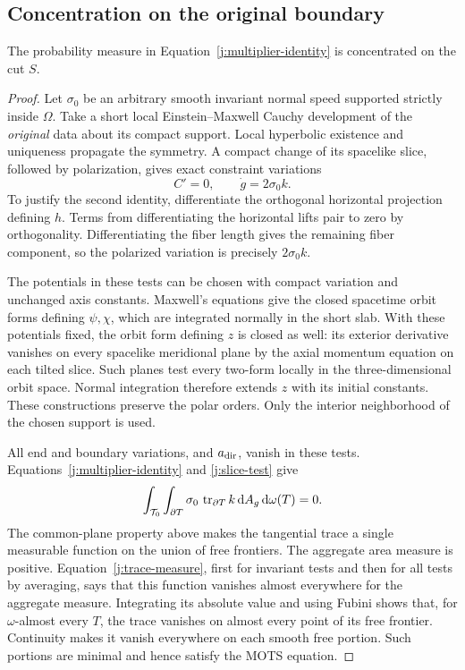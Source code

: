 \subsection{Concentration on the original boundary}

\begin{lemma}
\label{j:concentration}
The probability measure in Equation~\eqref{j:multiplier-identity}
is concentrated on the cut \(S\).
\end{lemma}

\begin{proof}
Let \(\sigma_0\) be an arbitrary smooth invariant normal speed supported
strictly inside \(\Omega\). Take a short local Einstein--Maxwell Cauchy
development of the \emph{original} data about its compact support.
Local hyperbolic existence and uniqueness propagate the symmetry.
A compact change of its spacelike slice, followed by polarization,
gives exact constraint variations
\begin{equation}
\label{j:slice-test}
 C'=0,\qquad \dot g=2\sigma_0k.
\end{equation}
To justify the second identity, differentiate the orthogonal horizontal
projection defining \(h\). Terms from differentiating the horizontal
lifts pair to zero by orthogonality. Differentiating the fiber length
gives the remaining fiber component, so the polarized variation is
precisely \(2\sigma_0k\).

The potentials in these tests can be chosen with compact variation and
unchanged axis constants. Maxwell's equations give the closed spacetime
orbit forms defining \(\psi,\chi\), which are integrated normally in the
short slab. With these potentials fixed, the orbit form defining \(z\)
is closed as well: its exterior derivative vanishes on every spacelike
meridional plane by the axial momentum equation on each tilted slice.
Such planes test every two-form locally in the three-dimensional orbit
space. Normal integration therefore extends \(z\) with its initial
constants. These constructions preserve the polar orders. Only the
interior neighborhood of the chosen support is used.

All end and boundary variations, and \(a_{\rm dir}\), vanish in these
tests. Equations~\eqref{j:multiplier-identity} and \eqref{j:slice-test} give
\begin{equation}
\label{j:trace-measure}
 \int_{\mathcal T_0}\int_{\partial T}
       \sigma_0\,\operatorname{tr}_{\partial T}k\,\mathrm d A_g\,\mathrm d\omega(T)=0.
\end{equation}
The common-plane property above makes the tangential trace a single
measurable function on the union of free frontiers. The aggregate area
measure is positive. Equation~\eqref{j:trace-measure}, first for invariant
tests and then for all tests by averaging, says that this function
vanishes almost everywhere for the aggregate measure. Integrating its
absolute value and using Fubini shows that, for \(\omega\)-almost every
\(T\), the trace vanishes on almost every point of its free frontier.
Continuity makes it vanish everywhere on each smooth free portion.
Such portions are minimal and hence satisfy the MOTS equation.


\end{proof}
